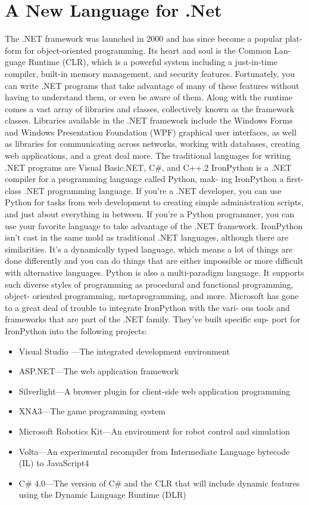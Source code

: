 \documentclass[12pt,a4paper,final,twoside,titlepage]{book}
\begin{document}
\section{A New Language for .Net}
The .NET framework was launched in 2000 and has since become a popular plat- form for object-oriented programming. Its heart and soul is the Common Lan- guage Runtime (CLR), which is a powerful system including a just-in-time compiler, built-in memory management, and security features. Fortunately, you can write .NET programs that take advantage of many of these features without having to understand them, or even be aware of them. Along with the runtime comes a vast array of libraries and classes, collectively known as the framework classes. Libraries available in the .NET framework include the Windows Forms and Windows Presentation Foundation (WPF) graphical user interfaces, as well as libraries for communicating across networks, working with databases, creating web applications, and a great deal more.
The traditional languages for writing .NET programs are Visual Basic.NET, C\#, and C++.2 IronPython is a .NET compiler for a programming language called Python, mak- ing IronPython a first-class .NET programming language. If you’re a .NET developer, you can use Python for tasks from web development to creating simple administration scripts, and just about everything in between. If you’re a Python programmer, you can use your favorite language to take advantage of the .NET framework.
IronPython isn’t cast in the same mold as traditional .NET languages, although there are similarities. It’s a dynamically typed language, which means a lot of things are done differently and you can do things that are either impossible or more difficult with alternative languages. Python is also a multi-paradigm language. It supports such diverse styles of programming as procedural and functional programming, object- oriented programming, metaprogramming, and more.
Microsoft has gone to a great deal of trouble to integrate IronPython with the vari- ous tools and frameworks that are part of the .NET family. They’ve built specific sup- port for IronPython into the following projects:
\begin{itemize}
\item Visual	Studio —The	integrated	development	environment 
\item ASP.NET—The web application framework 
\item Silverlight—A browser plugin for client-side web application programming 
\item XNA3—The game programming system 
\item Microsoft Robotics Kit—An environment for robot control and simulation 
\item Volta—An experimental recompiler from Intermediate Language bytecode (IL) to JavaScript4 
\item C\# 4.0—The  version of C\# and the CLR that will include dynamic features using the Dynamic Language Runtime (DLR)
\end{itemize}
\end{document}
